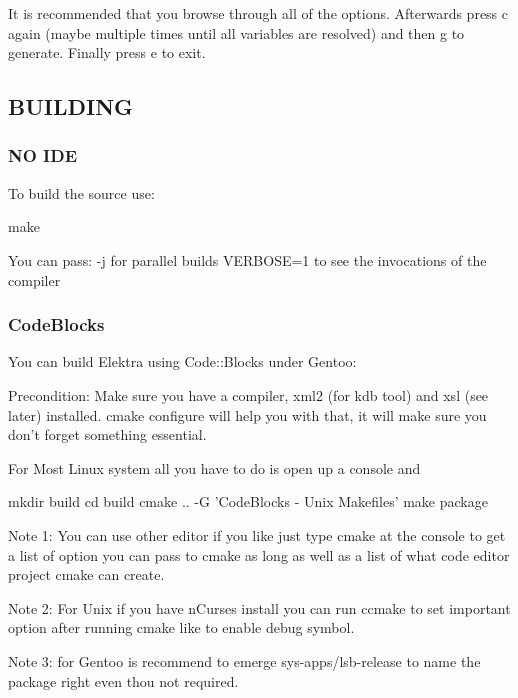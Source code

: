 It is recommended that you browse through all of the options. Afterwards press c again (maybe multiple times until all variables are resolved) and then g to generate. Finally press e to exit.

\subsection*{B\+U\+I\+L\+D\+I\+N\+G}

\subsubsection*{N\+O I\+D\+E}

To build the source use\+: \begin{DoxyVerb}make
\end{DoxyVerb}


You can pass\+: -\/j for parallel builds V\+E\+R\+B\+O\+S\+E=1 to see the invocations of the compiler

\subsubsection*{Code\+Blocks}

You can build Elektra using Code\+::\+Blocks under Gentoo\+:

Precondition\+: Make sure you have a compiler, xml2 (for kdb tool) and xsl (see later) installed. cmake configure will help you with that, it will make sure you don't forget something essential.

For Most Linux system all you have to do is open up a console and \begin{DoxyVerb}    mkdir build 
    cd build 
    cmake .. -G 'CodeBlocks - Unix Makefiles' 
    make package
\end{DoxyVerb}


Note 1\+: You can use other editor if you like just type cmake at the console to get a list of option you can pass to cmake as long as well as a list of what code editor project cmake can create.

Note 2\+: For Unix if you have n\+Curses install you can run ccmake to set important option after running cmake like to enable debug symbol.

Note 3\+: for Gentoo is recommend to emerge sys-\/apps/lsb-\/release to name the package right even thou not required. 
